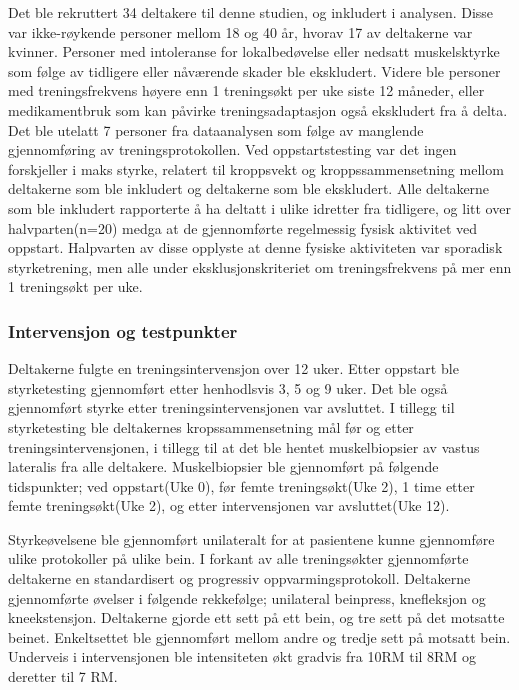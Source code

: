 \documentclass[
]{book}
\begin{document}
Det ble rekruttert 34 deltakere til denne studien, og inkludert i analysen. Disse var ikke-røykende personer mellom 18 og 40 år, hvorav 17 av deltakerne var kvinner. Personer med intoleranse for lokalbedøvelse eller nedsatt muskelsktyrke som følge av tidligere eller nåværende skader ble ekskludert. Videre ble personer med treningsfrekvens høyere enn 1 treningsøkt per uke siste 12 måneder, eller medikamentbruk som kan påvirke treningsadaptasjon også ekskludert fra å delta. Det ble utelatt 7 personer fra dataanalysen som følge av manglende gjennomføring av treningsprotokollen. Ved oppstartstesting var det ingen forskjeller i maks styrke, relatert til kroppsvekt og kroppssammensetning mellom deltakerne som ble inkludert og deltakerne som ble ekskludert. Alle deltakerne som ble inkludert rapporterte å ha deltatt i ulike idretter fra tidligere, og litt over halvparten(n=20) medga at de gjennomførte regelmessig fysisk aktivitet ved oppstart. Halpvarten av disse opplyste at denne fysiske aktiviteten var sporadisk styrketrening, men alle under eksklusjonskriteriet om treningsfrekvens på mer enn 1 treningsøkt per uke.

\hypertarget{intervensjon-og-testpunkter}{%
\subsubsection{Intervensjon og testpunkter}\label{intervensjon-og-testpunkter}}

Deltakerne fulgte en treningsintervensjon over 12 uker. Etter oppstart ble styrketesting gjennomført etter henhodlsvis 3, 5 og 9 uker. Det ble også gjennomført styrke etter treningsintervensjonen var avsluttet. I tillegg til styrketesting ble deltakernes kropssammensetning mål før og etter treningsintervensjonen, i tillegg til at det ble hentet muskelbiopsier av vastus lateralis fra alle deltakere. Muskelbiopsier ble gjennomført på følgende tidspunkter; ved oppstart(Uke 0), før femte treningsøkt(Uke 2), 1 time etter femte treningsøkt(Uke 2), og etter intervensjonen var avsluttet(Uke 12).

Styrkeøvelsene ble gjennomført unilateralt for at pasientene kunne gjennomføre ulike protokoller på ulike bein. I forkant av alle treningsøkter gjennomførte deltakerne en standardisert og progressiv oppvarmingsprotokoll. Deltakerne gjennomførte øvelser i følgende rekkefølge; unilateral beinpress, knefleksjon og kneekstensjon. Deltakerne gjorde ett sett på ett bein, og tre sett på det motsatte beinet. Enkeltsettet ble gjennomført mellom andre og tredje sett på motsatt bein. Underveis i intervensjonen ble intensiteten økt gradvis fra 10RM til 8RM og deretter til 7 RM.
\end{document}

